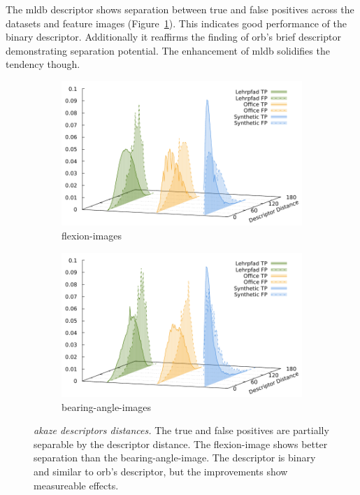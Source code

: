 The \acrshort{mldb} descriptor shows separation between true and false positives across the datasets and feature images (Figure~\ref{fig:descriptor_akaze}).
This indicates good performance of the binary descriptor.
Additionally it reaffirms the finding of \acrshort{orb}'s \acrshort{brief} descriptor demonstrating separation potential.
The enhancement of \acrshort{mldb} solidifies the tendency though.
\begin{figure}[htp]
\begin{subfigure}[t]{0.45\linewidth}
    \includegraphics[width=\linewidth]{chapter06/results/AKAZE/flexion/descriptor_distances.pdf}%
    \caption{\glspl{flexion-image}}
\end{subfigure}\quad
\begin{subfigure}[t]{0.45\linewidth}
    \includegraphics[width=\linewidth]{chapter06/results/AKAZE/bearing/descriptor_distances.pdf}%
    \caption{\glspl{bearing-angle-image}}
\end{subfigure}
\caption[\acrshort{akaze} descriptors distances]{\emph{\acrshort{akaze} descriptors distances.} The true and false positives are partially separable by the descriptor distance. The \gls{flexion-image} shows better separation than the \gls{bearing-angle-image}. The descriptor is binary and similar to \acrshort{orb}'s descriptor, but the improvements show measureable effects.}\label{fig:descriptor_akaze}
\end{figure}
